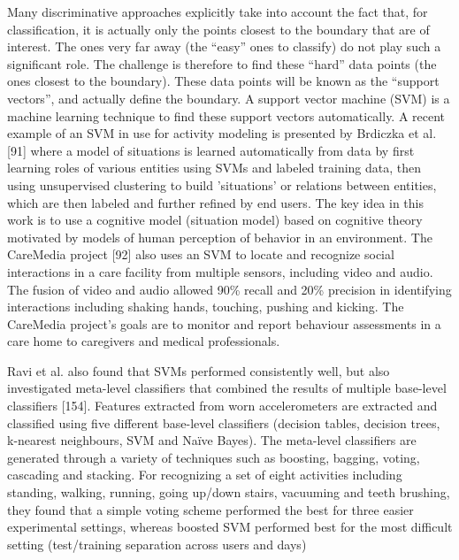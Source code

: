 Many discriminative approaches explicitly take into account the fact that, for classification, it is actually only the points closest to the boundary that are of interest. The ones very far away (the “easy” ones to classify) do not play such a significant role. The challenge is therefore to find these “hard” data points (the ones closest to the boundary). These data points will be known as the “support vectors”, and actually define the boundary. A support vector machine (SVM) is a machine learning technique to find these support vectors automatically. A recent example of an SVM in use for activity modeling is presented by Brdiczka et al. [91] where a model of situations is learned automatically from data by first learning roles of various entities using SVMs and labeled training data, then using unsupervised clustering to build ’situations’ or relations between entities, which are then labeled and further refined by end users. The key idea in this work is to use a cognitive model (situation model) based on cognitive theory motivated by models of human perception of behavior in an environment. The CareMedia project [92] also uses an SVM to locate and recognize social interactions in a care facility from multiple sensors, including video and audio. The fusion of video and audio allowed 90\% recall and 20\% precision in identifying interactions including shaking hands, touching, pushing and kicking. The CareMedia project’s goals are to monitor and report behaviour assessments in a care home to caregivers and medical professionals.

Ravi et al. also found that SVMs performed consistently well, but also investigated meta-level classifiers that combined the results of multiple base-level classifiers [154]. Features extracted from worn accelerometers are extracted and classified using five different base-level classifiers (decision tables, decision trees, k-nearest neighbours, SVM and Na\"ive Bayes). The meta-level classifiers are generated through a variety of techniques such as boosting, bagging, voting, cascading and stacking. For recognizing a set of eight activities including standing, walking, running, going up/down stairs, vacuuming and teeth brushing, they found that a simple voting scheme performed the best for three easier experimental settings, whereas boosted SVM performed best for the most difficult setting (test/training separation across users and days)

